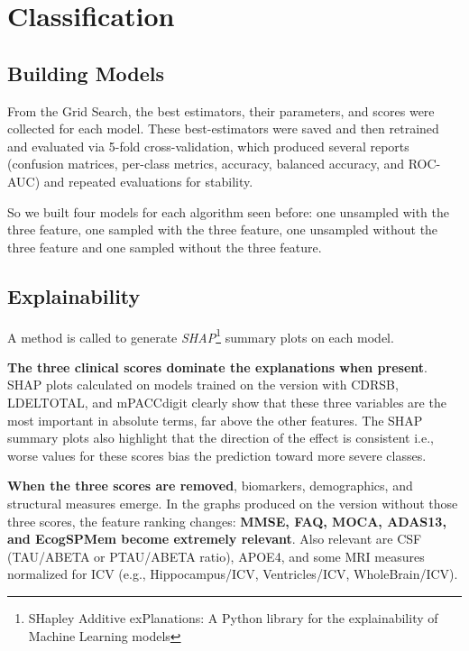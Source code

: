 \section{Classification}
\subsection{Building Models}
From the Grid Search, the best estimators, their parameters, and scores were collected for each model. These best-estimators were saved and then retrained and evaluated via 5-fold cross-validation, which produced several reports (confusion matrices, per-class metrics, accuracy, balanced accuracy, and ROC-AUC) and repeated evaluations for stability. 

So we built four models for each algorithm seen before: one unsampled with the three feature, one sampled with the three feature, one unsampled without the three feature and one sampled without the three feature. 

\subsection{Explainability}
A method is called to generate \textit{SHAP}\footnote{SHapley Additive exPlanations: A Python library for the explainability of Machine Learning models} summary plots on each model.

\vspace{2mm}

\textbf{The three clinical scores dominate the explanations when present}.
SHAP plots calculated on models trained on the version with CDRSB, LDELTOTAL, and mPACCdigit clearly show that these three variables are the most important in absolute terms, far above the other features. The SHAP summary plots also highlight that the direction of the effect is consistent i.e., worse values for these scores bias the prediction toward more severe classes. 

\vspace{2mm}

\textbf{When the three scores are removed}, biomarkers, demographics, and structural measures emerge.
In the graphs produced on the version without those three scores, the feature ranking changes: \textbf{MMSE, FAQ, MOCA, ADAS13, and EcogSPMem become extremely relevant}. Also relevant are CSF (TAU/ABETA or PTAU/ABETA ratio), APOE4, and some MRI measures normalized for ICV (e.g., Hippocampus/ICV, Ventricles/ICV, WholeBrain/ICV). 

\vspace{2mm}


